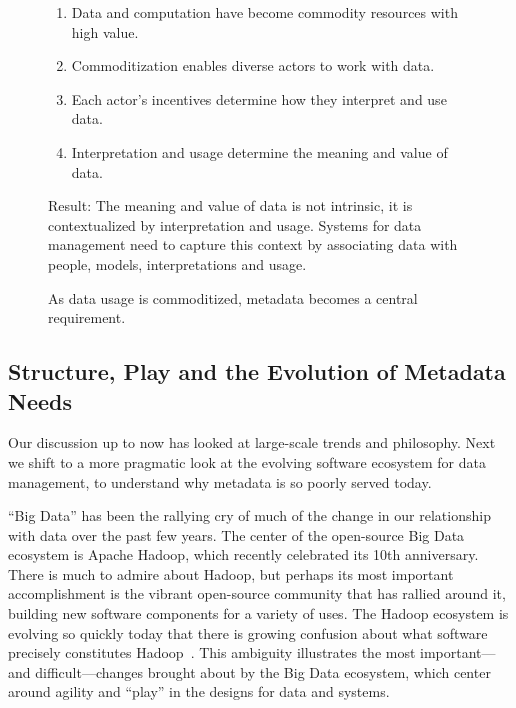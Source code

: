 \documentclass[10pt,letterpaper]{article}
\begin{document}
\begin{figure*}[t]
\begin{centering}
\begin{tcolorbox}[width=0.75\linewidth]
\begin{enumerate}
\item Data and computation have become commodity resources with high value.
\item Commoditization enables diverse actors to work with data.
\item Each actor's incentives determine how they interpret and use data.
\item Interpretation and usage determine the meaning and value of data.
\end{enumerate}
Result: The meaning and value of data is not intrinsic, it is contextualized by interpretation and usage. Systems for data management need to capture this context by associating data with people, models, interpretations and usage. 
\end{tcolorbox}
\end{centering}
\caption{As data usage is commoditized, metadata becomes a central requirement.}
\label{fig:syllogism}
\end{figure*}



\subsection{Structure, Play and the Evolution of Metadata Needs}
Our discussion up to now has looked at large-scale trends and philosophy.  Next we shift to a more pragmatic look at the evolving software ecosystem for data management, to understand why metadata is so poorly served today.

``Big Data'' has been the rallying cry of much of the change in our relationship with data over the past few years.  
The center of the open-source Big Data ecosystem is Apache Hadoop, which recently celebrated its 10th anniversary.  There is much to admire about Hadoop, but perhaps its most important accomplishment is the vibrant open-source community that has rallied around it, building new software components for a variety of uses. The Hadoop ecosystem is evolving so quickly today that there is growing confusion about what software precisely constitutes Hadoop~\cite{whatishadoop}.  This ambiguity illustrates the most important---and difficult---changes brought about by the Big Data ecosystem, which center around agility and ``play'' in the designs for data and systems.  
\end{document}
